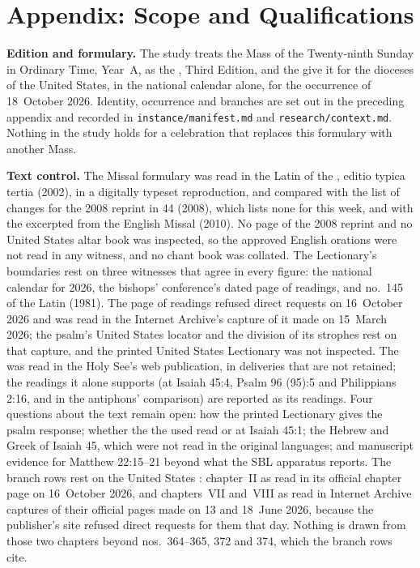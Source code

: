 \section{Appendix: Scope and Qualifications}
\label{sec:scope}

{\small
\textbf{Edition and formulary.} The study treats the Mass of the
Twenty-ninth Sunday in Ordinary Time, Year~A, as the ,
Third Edition, and the  give it for the dioceses of
the United States, in the national calendar alone, for the occurrence of
18~October 2026. Identity, occurrence and branches are set out in the
preceding appendix and recorded in \texttt{instance/manifest.md} and
\texttt{research/context.md}. Nothing in the study holds for a celebration that
replaces this formulary with another Mass.

\textbf{Text control.} The Missal formulary was read in the Latin of the
, editio typica tertia (2002), in a digitally typeset
reproduction, and compared with the list of changes for the 2008 reprint in
 44 (2008), which lists none for this week, and with the
 excerpted from the English Missal (2010). No page of the
2008 reprint and no United States altar book was inspected, so the approved
English orations were not read in any witness, and no chant book was
collated. The Lectionary's boundaries rest on three witnesses that agree in
every figure: the national calendar for 2026, the bishops' conference's dated
page of readings, and no.~145 of the Latin 
(1981). The page of readings refused direct requests on 16~October 2026 and
was read in the Internet Archive's capture of it made on 15~March 2026; the
psalm's United States locator and the division of its strophes rest on that
capture, and the printed United States Lectionary was not inspected. The
 was read in the Holy See's web publication, in deliveries
that are not retained; the readings it alone supports (at Isaiah 45:4,
Psalm 96 (95):5 and Philippians 2:16, and in the antiphons' comparison) are
reported as its readings. Four questions about the text remain open: how the
printed Lectionary gives the psalm response; whether the 
the  used read  or  at Isaiah 45:1; the
Hebrew and Greek of Isaiah 45, which were not read in the original languages;
and manuscript evidence for Matthew 22:15--21 beyond what the SBL apparatus
reports. The branch rows rest on the United States : chapter~II as read in its official chapter page on 16~October
2026, and chapters~VII and~VIII as read in Internet Archive captures of their
official pages made on 13 and 18~June 2026, because the publisher's site
refused direct requests for them that day. Nothing is drawn from those two
chapters beyond nos.~364--365, 372 and 374, which the branch rows cite.

}
